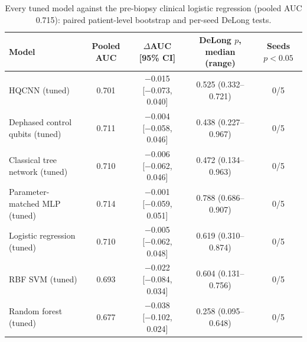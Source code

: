 \begin{table}[tbp]
\centering
\caption{Every tuned model against the pre-biopsy clinical logistic regression (pooled AUC \num{0.715}): paired patient-level bootstrap and per-seed DeLong tests.}
\label{tab:s_vs_clinical}
\footnotesize
\begin{tabular}{lcccc}
\toprule
Model & Pooled AUC & $\Delta$AUC [95\% CI] & DeLong $p$, median (range) & Seeds $p<0.05$ \\
\midrule
HQCNN (tuned) & \num{0.701} & \num{-0.015} [\num{-0.073}, \num{+0.040}] & \num{0.525} (\num{0.332}--\num{0.721}) & \num{0}/\num{5} \\
Dephased control qubits (tuned) & \num{0.711} & \num{-0.004} [\num{-0.058}, \num{+0.046}] & \num{0.438} (\num{0.227}--\num{0.967}) & \num{0}/\num{5} \\
Classical tree network (tuned) & \num{0.710} & \num{-0.006} [\num{-0.062}, \num{+0.046}] & \num{0.472} (\num{0.134}--\num{0.963}) & \num{0}/\num{5} \\
Parameter-matched MLP (tuned) & \num{0.714} & \num{-0.001} [\num{-0.059}, \num{+0.051}] & \num{0.788} (\num{0.686}--\num{0.907}) & \num{0}/\num{5} \\
Logistic regression (tuned) & \num{0.710} & \num{-0.005} [\num{-0.062}, \num{+0.048}] & \num{0.619} (\num{0.310}--\num{0.874}) & \num{0}/\num{5} \\
RBF SVM (tuned) & \num{0.693} & \num{-0.022} [\num{-0.084}, \num{+0.034}] & \num{0.604} (\num{0.131}--\num{0.756}) & \num{0}/\num{5} \\
Random forest (tuned) & \num{0.677} & \num{-0.038} [\num{-0.102}, \num{+0.024}] & \num{0.258} (\num{0.095}--\num{0.648}) & \num{0}/\num{5} \\
\bottomrule
\end{tabular}
\par{}
\end{table}
